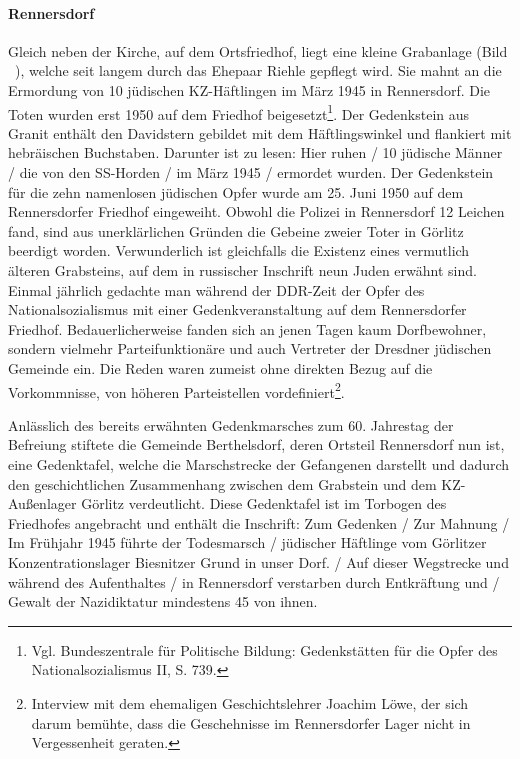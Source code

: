 \paragraph{Rennersdorf}
Gleich neben der Kirche, auf dem Ortsfriedhof, liegt eine kleine Grabanlage (Bild ~), welche seit langem durch das Ehepaar Riehle gepflegt wird. Sie mahnt an die Ermordung von 10 jüdischen KZ-Häftlingen im März 1945 in Rennersdorf. 
Die Toten wurden erst 1950 auf dem Friedhof beigesetzt\footnote{Vgl. Bundeszentrale für Politische Bildung: Gedenkstätten für die Opfer des Nationalsozialismus II, S. 739.}. Der Gedenkstein aus Granit enthält den Davidstern gebildet mit dem Häftlingswinkel und flankiert mit hebräischen Buchstaben. Darunter ist zu lesen: \glqq Hier ruhen / 10 jüdische Männer / die von den SS-Horden / im März 1945 / ermordet wurden\grqq. 
\newline
Der Gedenkstein für die zehn namenlosen jüdischen Opfer wurde am 25. Juni 1950 auf dem Rennersdorfer Friedhof eingeweiht. Obwohl die Polizei in Rennersdorf 12 Leichen fand, sind aus unerklärlichen Gründen die Gebeine zweier Toter in Görlitz beerdigt worden. Verwunderlich ist gleichfalls die Existenz eines vermutlich älteren Grabsteins, auf dem in russischer Inschrift neun Juden erwähnt sind. 
\newline
Einmal jährlich gedachte man während der DDR-Zeit der Opfer des Nationalsozialismus mit einer Gedenkveranstaltung auf dem Rennersdorfer Friedhof. Bedauerlicherweise fanden sich an jenen Tagen kaum Dorfbewohner, sondern vielmehr Parteifunktionäre und auch Vertreter der Dresdner jüdischen Gemeinde ein. Die Reden waren zumeist ohne direkten Bezug auf die Vorkommnisse, von höheren Parteistellen vordefiniert\footnote{Interview mit dem ehemaligen Geschichtslehrer Joachim Löwe, der sich darum bemühte, dass die Geschehnisse im Rennersdorfer Lager nicht in Vergessenheit geraten.}.\newline

Anlässlich des bereits erwähnten Gedenkmarsches zum 60. Jahrestag der Befreiung stiftete die Gemeinde Berthelsdorf, deren Ortsteil Rennersdorf nun ist, eine Gedenktafel, welche die Marschstrecke der Gefangenen darstellt und dadurch den geschichtlichen Zusammenhang zwischen dem Grabstein und dem KZ-Außenlager Görlitz verdeutlicht. Diese Gedenktafel ist im Torbogen des Friedhofes angebracht und enthält die Inschrift: \glqq Zum Gedenken / Zur Mahnung / Im Frühjahr 1945 führte der Todesmarsch / jüdischer Häftlinge vom Görlitzer Konzentrationslager Biesnitzer Grund in unser Dorf. / Auf dieser Wegstrecke und während des Aufenthaltes / in Rennersdorf verstarben durch Entkräftung und / Gewalt der Nazidiktatur mindestens 45 von ihnen.\grqq


